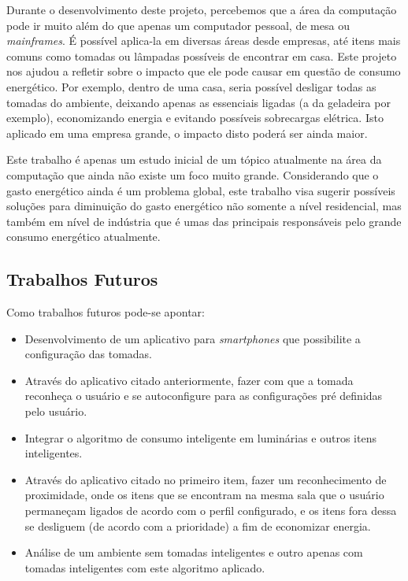 \documentclass[article,11pt,oneside,a4paper,english,brazil]{abntex2}
\begin{document}
		Durante o desenvolvimento deste projeto, percebemos que a área da computação pode ir muito além do que apenas um computador pessoal, de mesa ou \textit{mainframes}. É possível aplica-la em diversas áreas desde empresas, até itens mais comuns como tomadas ou lâmpadas possíveis de encontrar em casa. Este projeto nos ajudou a refletir sobre o impacto que ele pode causar em questão de consumo energético. Por exemplo, dentro de uma casa, seria possível desligar todas as tomadas do ambiente, deixando apenas as essenciais ligadas (a da geladeira por exemplo), economizando energia e evitando possíveis sobrecargas elétrica. Isto aplicado em uma empresa grande, o impacto disto poderá ser ainda maior.
		
		Este trabalho é apenas um estudo inicial de um tópico atualmente na área da computação que ainda não existe um foco muito grande. Considerando que o gasto energético ainda é um problema global, este trabalho visa sugerir possíveis soluções para diminuição do gasto energético não somente a nível residencial, mas também em nível de indústria que é umas das principais responsáveis pelo grande consumo energético atualmente.
	
	\subsection{Trabalhos Futuros} \label{sec:trabalhosfuturos}
	
		Como trabalhos futuros pode-se apontar:
		\begin{itemize}
			\item Desenvolvimento de um aplicativo para \textit{smartphones} que possibilite a configuração das tomadas.
			\item Através do aplicativo citado anteriormente, fazer com que a tomada reconheça o usuário e se autoconfigure para as configurações pré definidas pelo usuário.
			\item Integrar o algoritmo de consumo inteligente em luminárias e outros itens inteligentes.
			\item Através do aplicativo citado no primeiro item, fazer um reconhecimento de proximidade, onde os itens que se encontram na mesma sala que o usuário permaneçam ligados de acordo com o perfil configurado, e os itens fora dessa se desliguem (de acordo com a prioridade) a fim de economizar energia.
			\item Análise de um ambiente sem tomadas inteligentes e outro apenas com tomadas inteligentes com este algoritmo aplicado.
		\end{itemize}
\postextual
\end{document}
